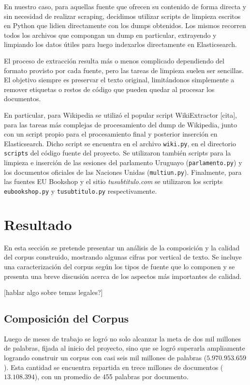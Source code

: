 En nuestro caso, para aquellas fuente que ofrecen su contenido de forma directa y sin necesidad
de realizar scraping, decidimos utilizar scripts de limpieza escritos en Python que lidien directamente
con los dumps obtenidos. Los mismos recorren todos los archivos que compongan un dump en
particular, extrayendo y limpiando los datos útiles para luego indexarlos directamente en Elasticsearch.

El proceso de extracción resulta más o menos complicado dependiendo del formato provisto por cada
fuente, pero las tareas de limpieza suelen ser sencillas. El objetivo siempre es preservar el texto
original, limitándonos simplemente a remover etiquetas o restos de código que pueden quedar al
procesar los documentos.

En particular, para Wikipedia se utilizó el popular script WikiExtractor [cita], para las tareas más
complejas de procesamiento del dump de Wikipedia, junto con un script propio para el procesamiento
final y posterior inserción en Elasticsearch. Dicho script se encuentra en el archivo \texttt{wiki.py},
en el directorio \texttt{scripts} del código fuente del proyecto. Se utilizaron también scripts para la
limpieza e inserción de las sesiones del parlamento Uruguayo (\texttt{parlamento.py}) y los documentos
oficiales de las Naciones Unidas (\texttt{multiun.py}). Finalmente, para las fuentes EU Bookshop y el
sitio \textit{tusubtitulo.com} se utilizaron los scripts \texttt{eubookshop.py} y \texttt{tusubtitulo.py}
respectivamente.


\section{Resultado}

En esta sección se pretende presentar un análisis de la composición y la calidad del corpus
construido, mostrando algunas cifras por vertical de texto. Se incluye una caracterización del
corpus según los tipos de fuente que lo componen y se presenta una breve discusión acerca de los
aspectos más importantes de calidad.


[hablar algo sobre temas legales?]


\subsection{Composición del Corpus}

Luego de meses de trabajo se logró no solo alcanzar la meta de dos mil millones de palabras,
fijada al inicio del proyecto, sino que se logró superarla ampliamente logrando construir un
corpus con casi seis mil millones de palabras ($5.970.953.659$). Esta cantidad se encuentra
repartida en trece millones de documentos ($13.108.394$), con un promedio de 455 palabras
por documento.

